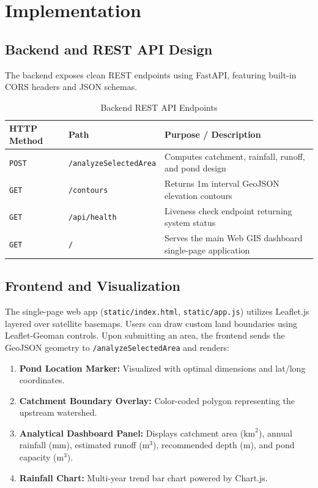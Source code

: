 \documentclass[11pt,a4paper]{article}
\begin{document}
\section{Implementation}
\label{sec:implementation}

\subsection{Backend and REST API Design}
The backend exposes clean REST endpoints using FastAPI, featuring built-in CORS headers and JSON schemas.

\begin{table}[h]
\centering
\caption{Backend REST API Endpoints}
\label{tab:endpoints}
\vspace{0.2cm}
\begin{tabular}{lll}
\toprule
\textbf{HTTP Method} & \textbf{Path} & \textbf{Purpose / Description} \\
\midrule
\texttt{POST} & \texttt{/analyzeSelectedArea} & Computes catchment, rainfall, runoff, and pond design \\
\texttt{GET} & \texttt{/contours} & Returns 1m interval GeoJSON elevation contours \\
\texttt{GET} & \texttt{/api/health} & Liveness check endpoint returning system status \\
\texttt{GET} & \texttt{/} & Serves the main Web GIS dashboard single-page application \\
\bottomrule
\end{tabular}
\end{table}

\subsection{Frontend and Visualization}
The single-page web app (\texttt{static/index.html}, \texttt{static/app.js}) utilizes Leaflet.js layered over satellite basemaps. Users can draw custom land boundaries using Leaflet-Geoman controls. Upon submitting an area, the frontend sends the GeoJSON geometry to \texttt{/analyzeSelectedArea} and renders:
\begin{enumerate}
    \item \textbf{Pond Location Marker:} Visualized with optimal dimensions and lat/long coordinates.
    \item \textbf{Catchment Boundary Overlay:} Color-coded polygon representing the upstream watershed.
    \item \textbf{Analytical Dashboard Panel:} Displays catchment area ($\text{km}^2$), annual rainfall (mm), estimated runoff ($\text{m}^3$), recommended depth (m), and pond capacity ($\text{m}^3$).
    \item \textbf{Rainfall Chart:} Multi-year trend bar chart powered by Chart.js.
\end{enumerate}
\end{document}
